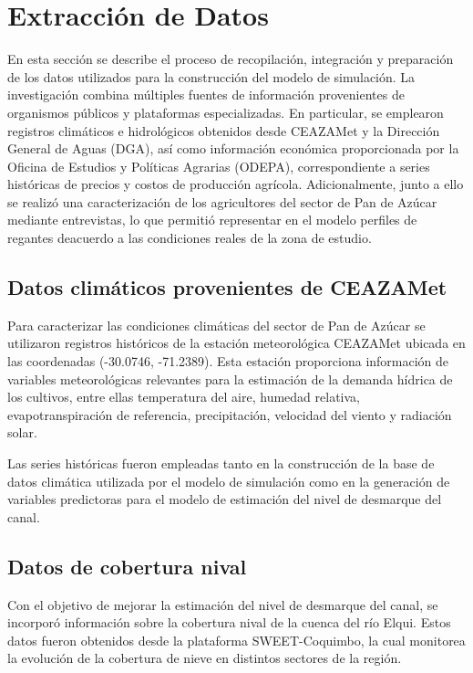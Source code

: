 \documentclass[12pt]{report}
\begin{document}
\section{Extracción de Datos}


En esta sección se describe el proceso de recopilación, integración y preparación de los datos utilizados para la construcción del modelo de simulación. La investigación combina múltiples fuentes de información provenientes de organismos públicos y plataformas especializadas. En particular, se emplearon registros climáticos e hidrológicos obtenidos desde CEAZAMet y la Dirección General de Aguas (DGA), así como información económica proporcionada por la Oficina de Estudios y Políticas Agrarias (ODEPA), correspondiente a series históricas de precios y costos de producción agrícola. Adicionalmente, junto a ello se realizó una caracterización de los agricultores del sector de Pan de Azúcar mediante entrevistas, lo que permitió representar en el modelo perfiles de regantes deacuerdo a las condiciones reales de la zona de estudio.

\subsection{Datos climáticos provenientes de CEAZAMet}

Para caracterizar las condiciones climáticas del sector de Pan de Azúcar se utilizaron registros históricos de la estación meteorológica CEAZAMet ubicada en las coordenadas (-30.0746, -71.2389). Esta estación proporciona información de variables meteorológicas relevantes para la estimación de la demanda hídrica de los cultivos, entre ellas temperatura del aire, humedad relativa, evapotranspiración de referencia, precipitación, velocidad del viento y radiación solar.

Las series históricas fueron empleadas tanto en la construcción de la base de datos climática utilizada por el modelo de simulación como en la generación de variables predictoras para el modelo de estimación del nivel de desmarque del canal.

\subsection{Datos de cobertura nival}

Con el objetivo de mejorar la estimación del nivel de desmarque del canal, se incorporó información sobre la cobertura nival de la cuenca del río Elqui. Estos datos fueron obtenidos desde la plataforma SWEET-Coquimbo, la cual monitorea la evolución de la cobertura de nieve en distintos sectores de la región.
\end{document}
